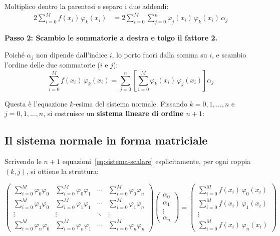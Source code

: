 \documentclass[a4paper,12pt]{article}
\theoremstyle{definition}
\theoremstyle{remark}
\begin{document}
Moltiplico dentro la parentesi e separo i due addendi:
\begin{align}
  2\sum_{i=0}^{M} f(x_i)\,\varphi_k(x_i)
  &= 2\sum_{i=0}^{M}\sum_{j=0}^{n}
     \varphi_j(x_i)\,\varphi_k(x_i)\,\alpha_j
  \label{eq:deriv2}
\end{align}

\medskip
\noindent \textbf{Passo 2: Scambio le sommatorie a destra e tolgo il
fattore 2.}

Poiché $\alpha_j$ non dipende dall'indice $i$, lo porto fuori dalla
somma su $i$, e scambio l'ordine delle due sommatorie ($i$ e $j$):
\begin{equation}
  \sum_{i=0}^{M} f(x_i)\,\varphi_k(x_i)
  = \sum_{j=0}^{n}
    \left[\sum_{i=0}^{M} \varphi_k(x_i)\,\varphi_j(x_i)\right]\alpha_j
  \label{eq:sistema-scalare}
\end{equation}

\noindent Questa è l'equazione $k$-esima del sistema normale.
Fissando $k = 0, 1, \ldots, n$ e $j = 0, 1, \ldots, n$, si costruisce
un \textbf{sistema lineare di ordine $n+1$}:

\subsection{Il sistema normale in forma matriciale}

Scrivendo le $n+1$ equazioni~\eqref{eq:sistema-scalare} esplicitamente,
per ogni coppia $(k, j)$, si ottiene la struttura:

\[
\begin{pmatrix}
  \displaystyle\sum_{i=0}^{M}\varphi_0\varphi_0 &
  \displaystyle\sum_{i=0}^{M}\varphi_0\varphi_1 &
  \cdots &
  \displaystyle\sum_{i=0}^{M}\varphi_0\varphi_n \\[10pt]
  \displaystyle\sum_{i=0}^{M}\varphi_1\varphi_0 &
  \displaystyle\sum_{i=0}^{M}\varphi_1\varphi_1 &
  \cdots &
  \displaystyle\sum_{i=0}^{M}\varphi_1\varphi_n \\[10pt]
  \vdots & \vdots & \ddots & \vdots \\[6pt]
  \displaystyle\sum_{i=0}^{M}\varphi_n\varphi_0 &
  \displaystyle\sum_{i=0}^{M}\varphi_n\varphi_1 &
  \cdots &
  \displaystyle\sum_{i=0}^{M}\varphi_n\varphi_n
\end{pmatrix}
\begin{pmatrix}\alpha_0\\\alpha_1\\\vdots\\\alpha_n\end{pmatrix}
=
\begin{pmatrix}
  \displaystyle\sum_{i=0}^{M} f(x_i)\,\varphi_0(x_i) \\[10pt]
  \displaystyle\sum_{i=0}^{M} f(x_i)\,\varphi_1(x_i) \\[10pt]
  \vdots \\[6pt]
  \displaystyle\sum_{i=0}^{M} f(x_i)\,\varphi_n(x_i)
\end{pmatrix}
\]
\end{document}
